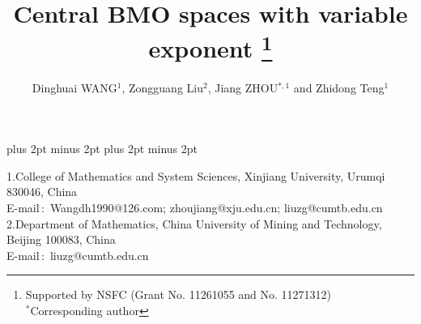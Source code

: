 \documentclass{amse-new}
\numberwithin{equation}{section} %
\begin{document}

\abovedisplayskip 6pt plus 2pt minus 2pt \belowdisplayskip 6pt
plus 2pt minus 2pt
\def\vsp{\vspace{1mm}}
\def\th#1{\vspace{1mm}\noindent{\bf #1}\quad}
\def\proof{\vspace{1mm}\noindent{\it Proof}\quad}
\def\no{\nonumber}
\newenvironment{prof}[1][Proof]{\noindent\textit{#1}\quad }
{\hfill $\Box$\vspace{0.7mm}}
\def\q{\quad} \def\qq{\qquad}
\allowdisplaybreaks[4]








\title{Central BMO spaces with variable exponent    %
\footnote{Supported by NSFC (Grant No. 11261055 and No. 11271312)\\  $^\ast$Corresponding author}}                  %

\author{Dinghuai \uppercase{Wang}$^{1}$, Zongguang Liu$^{2}$, Jiang \uppercase{Zhou}$^{\ast,1}$ and Zhidong Teng$^{1}$}           %
    {1.College of Mathematics and System Sciences, Xinjiang University, Urumqi 830046, China\\
    E-mail\,$:$ Wangdh1990@126.com; zhoujiang@xju.edu.cn; liuzg@cumtb.edu.cn\\
2.Department of Mathematics, China University of Mining and Technology, Beijing 100083, China\\
E-mail\,$:$ liuzg@cumtb.edu.cn\\}
\end{document}
